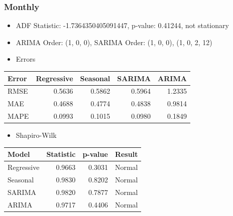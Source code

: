 \documentclass[a4paper,12pt]{article}
\begin{document}
\subsubsection{Monthly}
\label{sec:org89f8d24}
\begin{itemize}
\item ADF Statistic: -1.7364350405091447, p-value: 0.41244, not stationary
\item ARIMA Order: (1, 0, 0), SARIMA Order: (1, 0, 0), (1, 0, 2, 12)
\item Errors
\end{itemize}
\begin{center}
\begin{tabular}{lrrrr}
Error & \textbf{Regressive} & Seasonal & SARIMA & ARIMA\\[0pt]
\hline
RMSE & 0.5636 & 0.5862 & 0.5964 & 1.2335\\[0pt]
MAE & 0.4688 & 0.4774 & 0.4838 & 0.9814\\[0pt]
MAPE & 0.0993 & 0.1015 & 0.0980 & 0.1849\\[0pt]
\end{tabular}
\end{center}
\begin{itemize}
\item Shapiro-Wilk
\end{itemize}
\begin{center}
\begin{tabular}{lrrl}
Model & Statistic & p-value & Result\\[0pt]
\hline
Regressive & 0.9663 & 0.3031 & Normal\\[0pt]
Seasonal & 0.9830 & 0.8202 & Normal\\[0pt]
SARIMA & 0.9820 & 0.7877 & Normal\\[0pt]
ARIMA & 0.9717 & 0.4406 & Normal\\[0pt]
\end{tabular}
\end{center}
\end{document}
